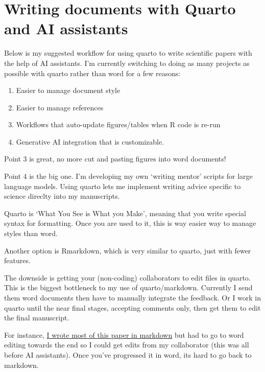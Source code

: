 \documentclass[
  letterpaper,
  DIV=11,
  numbers=noendperiod]{scrreprt}
\begin{document}

\chapter{Writing documents with Quarto and AI
assistants}\label{writing-documents-with-quarto-and-ai-assistants}

Below is my suggested workflow for using quarto to write scientific
papers with the help of AI assistants. I'm currently switching to doing
as many projects as possible with quarto rather than word for a few
reasons:

\begin{enumerate}
\def\labelenumi{\arabic{enumi}.}
\item
  Easier to manage document style
\item
  Easier to manage references
\item
  Workflows that auto-update figures/tables when R code is re-run
\item
  Generative AI integration that is customizable.
\end{enumerate}

Point 3 is great, no more cut and pasting figures into word documents!

Point 4 is the big one. I'm developing my own `writing mentor' scripts
for large language models. Using quarto lets me implement writing advice
specific to science direclty into my manuscripts.

Quarto is `What You See is What you Make', meaning that you write
special syntax for formatting. Once you are used to it, this is way
easier way to manage styles than word.

Another option is Rmarkdown, which is very similar to quarto, just with
fewer features.

The downside is getting your (non-coding) collaborators to edit files in
quarto. This is the biggest bottleneck to my use of quarto/markdown.
Currently I send them word documents then have to manually integrate the
feedback. Or I work in quarto until the near final stages, accepting
comments only, then get them to edit the final manuscript.

For instance,
\href{https://conbio.onlinelibrary.wiley.com/doi/full/10.1111/cobi.13079?casa_token=zF8vihnFfcMAAAAA\%3A9WlbXPCghdwS2WvyRqGjRqYPrng7q4_xPwZvu9K52p6gd_8lWs2qcgrehfg4ehAThC7ni32Ybr02iA}{I
wrote most of this paper in markdown} but had to go to word editing
towards the end so I could get edits from my collaborator (this was all
before AI assistants). Once you've progressed it in word, its hard to go
back to markdown.
\end{document}
